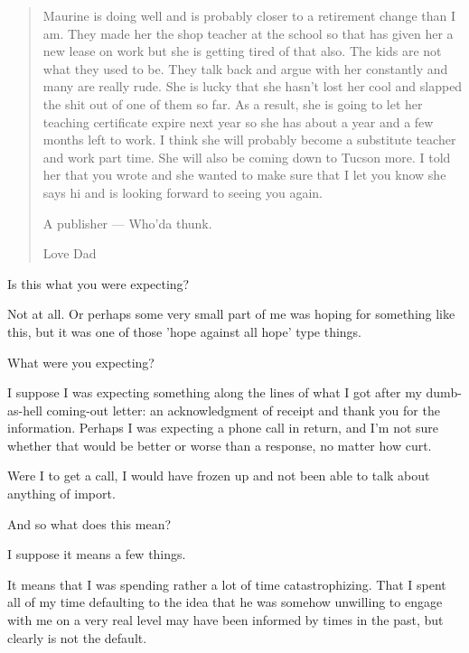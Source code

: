 \begin{quotation}
  Maurine is doing well and is probably closer to a retirement change than I am. They made her the shop teacher at the school so that has given her a new lease on work but she is getting tired of that also. The kids are not what they used to be. They talk back and argue with her constantly and many are really rude. She is lucky that she hasn't lost her cool and slapped the shit out of one of them so far. As a result, she is going to let her teaching certificate expire next year so she has about a year and a few months left to work. I think she will probably become a substitute teacher and work part time. She will also be coming down to Tucson more. I told her that you wrote and she wanted to make sure that I let you know she says hi and is looking forward to seeing you again.

  A publisher --- Who'da thunk.

  Love Dad
\end{quotation}

\newpage

\begin{ally}
  Is this what you were expecting?
\end{ally}

Not at all. Or perhaps some very small part of me was hoping for something like this, but it was one of those 'hope against all hope' type things.

\begin{ally}
  What were you expecting?
\end{ally}

I suppose I was expecting something along the lines of what I got after my dumb-as-hell coming-out letter: an acknowledgment of receipt and thank you for the information. Perhaps I was expecting a phone call in return, and I'm not sure whether that would be better or worse than a response, no matter how curt.

Were I to get a call, I would have frozen up and not been able to talk about anything of import.

\begin{ally}
  And so what does this mean?
\end{ally}

I suppose it means a few things.

It means that I was spending rather a lot of time catastrophizing. That I spent all of my time defaulting to the idea that he was somehow unwilling to engage with me on a very real level may have been informed by times in the past, but clearly is not the default.

